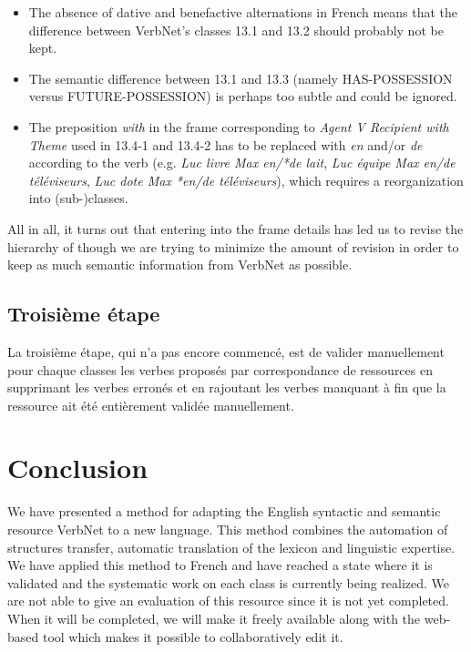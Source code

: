 \begin{itemize}

    \item  The absence of dative and benefactive alternations in French means that
    the difference between VerbNet's classes 13.1 and 13.2 should probably not be
    kept.

    \item  The semantic difference between 13.1 and 13.3 (namely HAS-POSSESSION
    versus FUTURE-POSSESSION) is perhaps too subtle and could be ignored.

    \item  The preposition \emph{with} in the frame corresponding to \emph{Agent V
    Recipient {with} Theme} used in 13.4-1 and 13.4-2 has to be replaced with
    \emph{en} and/or \emph{de} according to the verb (e.g. \emph{Luc livre Max
    en/*de lait}, \emph{Luc équipe Max en/de téléviseurs}, \emph{Luc dote Max
    *en/de téléviseurs}), which requires a reorganization into (sub-)classes.

\end{itemize}

All in all, it turns out that entering into the frame details has led us to
revise the hierarchy of \verbenet{} though we are trying to minimize the amount
of revision in order to keep as much semantic information from VerbNet as
possible.

\subsection{Troisième étape}
\label{third}

La troisième étape, qui n'a pas encore commencé, est de valider manuellement
pour chaque classes les verbes proposés par correspondance de ressources en
supprimant les verbes erronés et en rajoutant les verbes manquant à fin que la
ressource ait été entièrement validée manuellement.

\section{Conclusion} We have presented a method for adapting the English
syntactic and semantic resource VerbNet to a new language. This method combines
the automation of structures transfer, automatic translation of the lexicon and
linguistic expertise. We have applied this method to French and have reached a
state where it is validated and the systematic work on each class is currently
being realized.  We are not  able to give an evaluation of this resource since
it is not yet completed. When it will be completed, we will make it freely
available along with the web-based tool which makes it possible to
collaboratively edit it.

